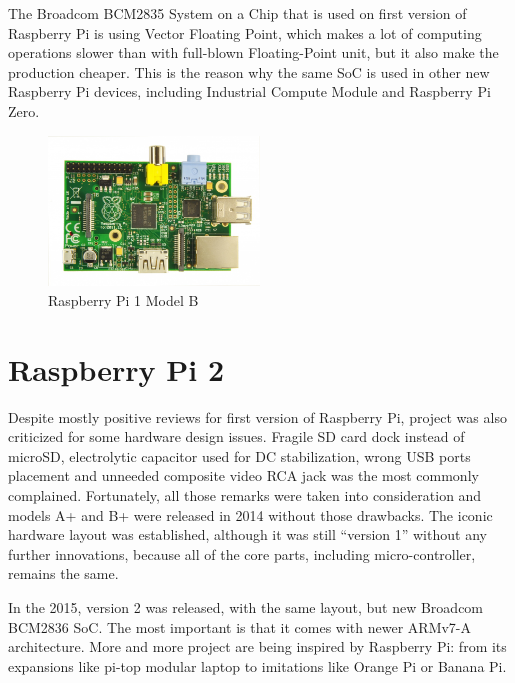 \documentclass[printmode]{mgr}
\begin{document}
The Broadcom BCM2835 System on a Chip that is used on first version of Raspberry Pi is using Vector Floating Point, which makes a lot of computing operations slower than with full-blown Floating-Point unit, but it also make the production cheaper.
This is the reason why the same SoC is used in other new Raspberry Pi devices, including Industrial Compute Module and Raspberry Pi Zero.




\begin{figure}[htbp]
  \centering
    \includegraphics[width=0.5\textwidth]{raspberrypi-front.jpg}
  \caption{Raspberry Pi 1 Model B}
  \label{fig:devboard-raspberrypi}
\end{figure}


\section{Raspberry Pi 2}

Despite mostly positive reviews for first version of Raspberry Pi, project was also criticized for some hardware design issues.
Fragile SD card dock instead of microSD, electrolytic capacitor used for DC stabilization, wrong USB ports placement and unneeded composite video RCA jack was the most commonly complained.\cite{web:raspberrypi-issues}
Fortunately, all those remarks were taken into consideration and models A+ and B+ were released in 2014 without those drawbacks.
The iconic hardware layout was established, although it was still ``version 1'' without any further innovations, because all of the core parts, including micro-controller, remains the same.

In the 2015, version 2 was released, with the same layout, but new Broadcom BCM2836 SoC.
The most important is that it comes with newer ARMv7-A architecture.
More and more project are being inspired by Raspberry Pi: from its expansions like pi-top modular laptop to imitations like Orange Pi or Banana Pi.\cite{web:pi-top}
\end{document}
